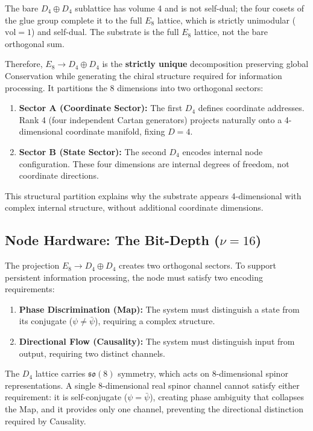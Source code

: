 The bare $D_4 \oplus D_4$ sublattice has volume 4 and is not self-dual; the four cosets of the glue group complete it to the full $E_8$ lattice, which is strictly unimodular ($\mathrm{vol}=1$) and self-dual. The substrate is the full $E_8$ lattice, not the bare orthogonal sum.

Therefore, $E_8 \to D_4 \oplus D_4$ is the \textbf{strictly unique} decomposition preserving global Conservation while generating the chiral structure required for information processing. It partitions the 8 dimensions into two orthogonal sectors:

\begin{enumerate}
    \item \textbf{Sector A (Coordinate Sector):} The first $D_4$ defines coordinate addresses. Rank 4 (four independent Cartan generators) projects naturally onto a 4-dimensional coordinate manifold, fixing $D=4$.
    \item \textbf{Sector B (State Sector):} The second $D_4$ encodes internal node configuration. These four dimensions are internal degrees of freedom, not coordinate directions.
\end{enumerate}

This structural partition explains why the substrate appears 4-dimensional with complex internal structure, without additional coordinate dimensions.


\subsection{Node Hardware: The Bit-Depth (\texorpdfstring{$\nu=16$}{nu=16})}
\label{sec:chiralcapacity}

The projection $E_8 \to D_4 \oplus D_4$ creates two orthogonal sectors. To support persistent information processing, the node must satisfy two encoding requirements:

\begin{enumerate}
    \item \textbf{Phase Discrimination (Map):} The system must distinguish a state from its conjugate ($\psi \neq \bar{\psi}$), requiring a complex structure.
    \item \textbf{Directional Flow (Causality):} The system must distinguish input from output, requiring two distinct channels.
\end{enumerate}

The $D_4$ lattice carries $\mathfrak{so}(8)$ symmetry, which acts on 8-dimensional spinor representations. A single 8-dimensional real spinor channel cannot satisfy either requirement: it is
self-conjugate ($\psi = \bar{\psi}$), creating phase ambiguity that collapses the Map, and it provides only one channel, preventing the directional distinction required by Causality.

